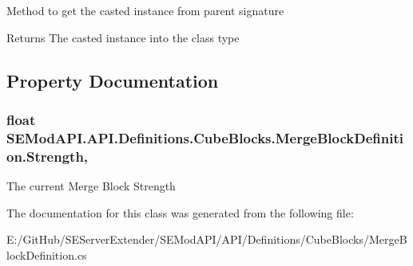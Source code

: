 Method to get the casted instance from parent signature 

\begin{DoxyReturn}{Returns}
The casted instance into the class type
\end{DoxyReturn}


\subsection{Property Documentation}
\hypertarget{class_s_e_mod_a_p_i_1_1_a_p_i_1_1_definitions_1_1_cube_blocks_1_1_merge_block_definition_a4ecc490840464d0df960013581ac8d4d}{}
\subsubsection[{Strength}]{\setlength{\rightskip}{0pt plus 5cm}float S\+E\+Mod\+A\+P\+I.\+A\+P\+I.\+Definitions.\+Cube\+Blocks.\+Merge\+Block\+Definition.\+Strength\hspace{0.3cm}{\ttfamily [get]}, {\ttfamily [set]}}\label{class_s_e_mod_a_p_i_1_1_a_p_i_1_1_definitions_1_1_cube_blocks_1_1_merge_block_definition_a4ecc490840464d0df960013581ac8d4d}


The current Merge Block Strength 



The documentation for this class was generated from the following file\+:\begin{DoxyCompactItemize}
\item 
E\+:/\+Git\+Hub/\+S\+E\+Server\+Extender/\+S\+E\+Mod\+A\+P\+I/\+A\+P\+I/\+Definitions/\+Cube\+Blocks/Merge\+Block\+Definition.\+cs\end{DoxyCompactItemize}
